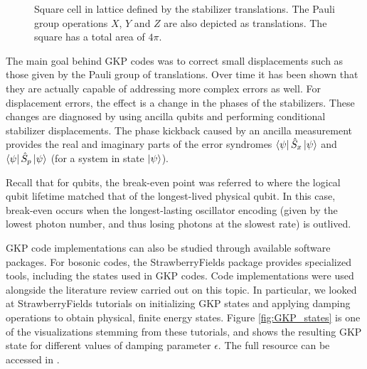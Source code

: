 \begin{figure}
    \centering
    \caption[Square cell in lattice with stabilizer translations and Pauli operators]{Square cell in lattice defined by the stabilizer translations. The Pauli group operations $X$, $Y$ and $Z$ are also depicted as translations. The square has a total area of $4\pi$.}
    \label{fig:GKP_pauli_ops}
\end{figure}



The main goal behind GKP codes was to correct small displacements such as those given by the Pauli group of translations. Over time it has been shown that they are actually capable of addressing more complex errors as well.
For displacement errors, the effect is a change in the phases of the stabilizers. These changes are diagnosed by using ancilla qubits and performing conditional stabilizer displacements. The phase kickback caused by an ancilla measurement provides the real and imaginary parts of the error syndromes $\bra{\psi}\hat{S}_x\ket{\psi}$ and $\bra{\psi}\hat{S}_p\ket{\psi}$ (for a system in state $\ket{\psi}$).

Recall that for qubits, the break-even point was referred to where the logical qubit lifetime matched that of the longest-lived physical qubit. In this case, break-even occurs when the longest-lasting oscillator encoding (given by the lowest photon number, and thus losing photons at the slowest rate) is outlived.

GKP code implementations can also be studied through available software packages. For bosonic codes, the StrawberryFields package provides specialized tools, including the states used in GKP codes. Code implementations were used alongside the literature review carried out on this topic. In particular, we looked at StrawberryFields tutorials on initializing GKP states and applying damping operations to obtain physical, finite energy states. Figure \ref{fig:GKP_states} is one of the visualizations stemming from these tutorials, and shows the resulting GKP state for different values of damping parameter $\epsilon$. The full resource can be accessed in \cite{strawberryFields}.

